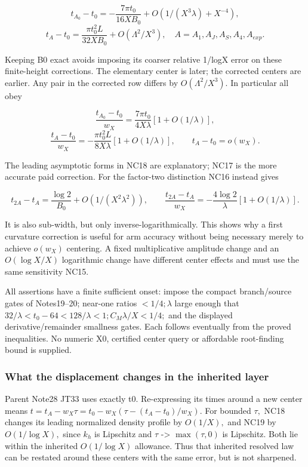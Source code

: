 \[
\boxed{t_{A_0}-t_0=-\frac{7\pi t_0}{16XB_0}
       +O(1/(X^3\lambda)+X^{-4}),}
\]
\[
\boxed{t_A-t_0=\frac{\pi t_0^2L}{32XB_0}
          +O(\Lambda^2/X^3),\quad A=A_1,A_J,A_S,A_4,A_{exp}.}
\tag{NC17}\label{eq:ansatz-nc17}
\]

Keeping B0 exact avoids imposing its coarser relative 1/logX error on these finite-height corrections. The elementary center is later; the corrected centers are earlier. Any pair in the corrected row differs by \(O(\Lambda^{2}/X^{3}).\) In particular all obey

\[
\frac{t_{A_0}-t_0}{w_X}
 =\frac{7\pi t_0}{4X\lambda}[1+O(1/\lambda)],
\]
\[
\frac{t_A-t_0}{w_X}
 =-\frac{\pi t_0^2L}{8X\lambda}[1+O(1/\lambda)],
\qquad t_A-t_0=o(w_X).
\tag{NC18}\label{eq:ansatz-nc18}
\]

The leading asymptotic forms in NC18 are explanatory; NC17 is the more accurate paid correction. For the factor-two distinction NC16 instead gives

\[
t_{2A}-t_A=\frac{\log2}{B_0}
                +O(1/(X^2\lambda^2)),\qquad
\frac{t_{2A}-t_A}{w_X}
 =-\frac{4\log2}{\lambda}[1+O(1/\lambda)].
\tag{NC19}\label{eq:ansatz-nc19}
\]

It is also sub-width, but only inverse-logarithmically. This shows why a first curvature correction is useful for arm accuracy without being necessary merely to achieve \(o(w_{X})\) centering. A fixed multiplicative amplitude change and an \(O(\log X/X)\) logarithmic change have different center effects and must use the same sensitivity NC15.

All assertions have a finite sufficient onset: impose the compact branch/source gates of Notes19--20; near-one ratios \(<1/4; \lambda\) large enough that \(32/\lambda<t_{0}-64<128/\lambda<1; C_{M} \lambda/X<1/4;\) and the displayed derivative/remainder smallness gates. Each follows eventually from the proved inequalities. No numeric X0, certified center query or affordable root-finding bound is supplied.

\subsubsection{What the displacement changes in the inherited layer}
\label{subsec:nc-5}

Parent Note28 JT33 uses exactly t0. Re-expressing its times around a new center means \(t=t_{A}-w_{X} \tau=t_{0}-w_{X}(\tau-(t_{A}-t_{0})/w_{X}).\) For bounded \(\tau,\) NC18 changes its leading normalized density profile by \(O(1/X),\) and NC19 by \(O(1/\log X),\) since \(k_{h}\) is Lipschitz and \(\tau\) -> \(\max(\tau,0)\) is Lipschitz. Both lie within the inherited \(O(1/\log X)\) allowance. Thus that inherited resolved law can be restated around these centers with the same error, but is not sharpened.

